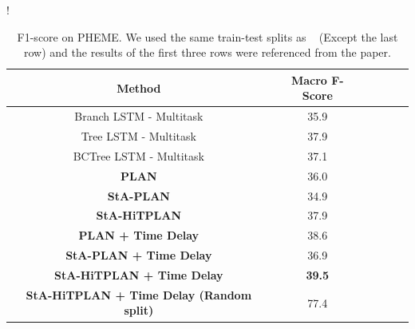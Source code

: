 \documentclass[letterpaper]{article} %
\begin{document}
\begin{table}
\small
\centering
{}!{
\begin{tabular}{cccccc} \toprule
Method & Macro F-Score \\ \midrule
Branch LSTM - Multitask	& 35.9 \\
Tree LSTM - Multitask & 37.9 \\
BCTree LSTM - Multitask & 37.1 \\ \bottomrule
\textbf{PLAN}	& 36.0 \\
\textbf{StA-PLAN} & 34.9 \\
\textbf{StA-HiTPLAN} & 37.9 \\
\textbf{PLAN + Time Delay}	& 38.6 \\
\textbf{StA-PLAN + Time Delay} & 36.9 \\
\textbf{StA-HiTPLAN + Time Delay} & \textbf{39.5} \\
\textbf{StA-HiTPLAN + Time Delay (Random split)} & 77.4 \\
\bottomrule 
\end{tabular}
}
\caption{F1-score on PHEME. We used the same train-test splits as ~\cite{kumar19} (Except the last row) and the results of the first three rows were referenced from the paper.}
\label{tab:results_pheme}
\end{table}
\end{document}
